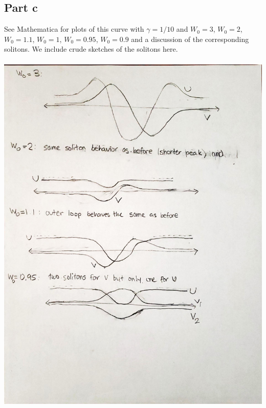 \documentclass{article}
\begin{document}
\subsection{Part c}
See Mathematica for plots of this curve with $\gamma=1/10$ and $W_0=3$, $W_0=2$, $W_0=1.1$,
$W_0=1$, $W_0=0.95$, $W_0=0.9$ and a discussion of the corresponding solitons. We include crude sketches of the solitons here.\\ \\
\includegraphics[scale=0.5]{573drawing.pdf}\\
\end{document}
